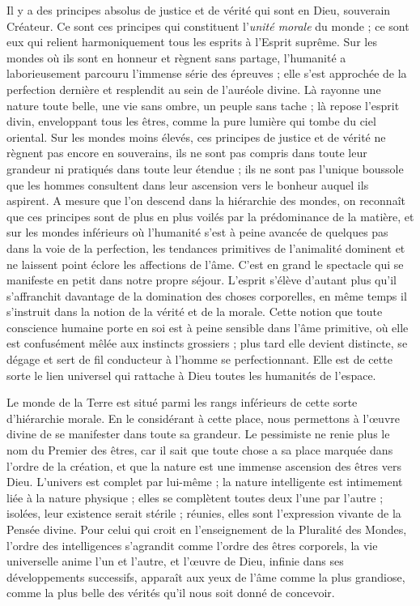 \documentclass[a4paper, 11pt, oneside, landscape]{article}
\begin{document}
Il y a des principes absolus de justice et de vérité qui sont en Dieu, souverain Créateur. Ce sont ces principes qui constituent l'\emph{unité morale} du monde ; ce sont eux qui relient harmoniquement tous les esprits à l'Esprit suprême. Sur les mondes où ils sont en honneur et règnent sans partage, l'humanité a laborieusement parcouru l'immense série des épreuves ; elle s'est approchée de la perfection dernière et resplendit au sein de l'auréole divine. Là rayonne une nature toute belle, une vie sans ombre, un peuple sans tache ; là repose l'esprit divin, enveloppant tous les êtres, comme la pure lumière qui tombe du ciel oriental. Sur les mondes moins élevés, ces principes de justice et de vérité ne règnent pas encore en souverains, ils ne sont pas compris dans toute leur grandeur ni pratiqués dans toute leur étendue ; ils ne sont pas l'unique boussole que les hommes consultent dans leur ascension vers le bonheur auquel ils aspirent. A mesure que l'on descend dans la hiérarchie des mondes, on reconnaît que ces principes sont de plus en plus voilés par la prédominance de la matière, et sur les mondes inférieurs où l'humanité s'est à peine avancée de quelques pas dans la voie de la perfection, les tendances primitives de l'animalité dominent et ne laissent point éclore les affections de l'âme. C'est en grand le spectacle qui se manifeste en petit dans notre propre séjour. L'esprit s'élève d'autant plus qu'il s'affranchit davantage de la domination des choses corporelles, en même temps il s'instruit dans la notion de la vérité et de la morale. Cette notion que toute conscience humaine porte en soi est à peine sensible dans l'âme primitive, où elle est confusément mêlée aux instincts grossiers ; plus tard elle devient distincte, se dégage et sert de fil conducteur à l'homme se perfectionnant. Elle est de cette sorte le lien universel qui rattache à Dieu toutes les humanités de l'espace.

Le monde de la Terre est situé parmi les rangs inférieurs de cette sorte d'hiérarchie morale. En le considérant à cette place, nous permettons à l'œuvre divine de se manifester dans toute sa grandeur. Le pessimiste ne renie plus le nom du Premier des êtres, car il sait que toute chose a sa place marquée dans l'ordre de la création, et que la nature est une immense ascension des êtres vers Dieu. L'univers est complet par lui-même ; la nature intelligente est intimement liée à la nature physique ; elles se complètent toutes deux l'une par l'autre ; isolées, leur existence serait stérile ; réunies, elles sont l'expression vivante de la Pensée divine. Pour celui qui croit en l'enseignement de la Pluralité des Mondes, l'ordre des intelligences s'agrandit comme l'ordre des êtres corporels, la vie universelle anime l'un et l'autre, et l'œuvre de Dieu, infinie dans ses développements successifs, apparaît aux yeux de l'âme comme la plus grandiose, comme la plus belle des vérités qu'il nous soit donné de concevoir.
\clearpage
\end{document}
